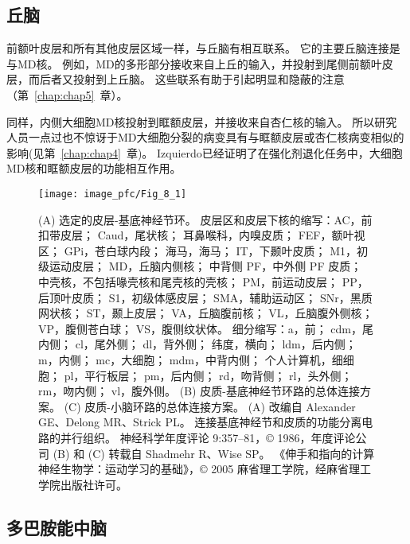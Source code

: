 \subsection{丘脑}
\par

前额叶皮层和所有其他皮层区域一样，与丘脑有相互联系。
它的主要丘脑连接是与MD核。
例如，MD的多形部分接收来自上丘的输入\cite{russchen1987afferent,erickson2004subcortical}，并投射到尾侧前额叶皮层，而后者又投射到上丘脑\cite{fries1984cortical}。
这些联系有助于引起明显和隐蔽的注意（第~\ref{chap:chap5}~章）。
\par


同样，内侧大细胞MD核投射到眶额皮层\cite{ray1993organization}，并接收来自杏仁核的输入\cite{russchen1987afferent}。
所以研究人员一点过也不惊讶于MD大细胞分裂的病变具有与眶额皮层或杏仁核病变相似的影响\cite{mitchell2007neurotoxic}(见第~\ref{chap:chap4}~章)。
Izquierdo\cite{izquierdo2010functional}已经证明了在强化剂退化任务中，大细胞MD核和眶额皮层的功能相互作用。


\begin{figure} 
	\centering
	\texttt{[image: image\_pfc/Fig\_8\_1]}
	\caption{(A) 选定的皮层-基底神经节环。 
	皮层区和皮层下核的缩写：AC，前扣带皮层； Caud，尾状核； 耳鼻喉科，内嗅皮质； FEF，额叶视区； GPi，苍白球内段； 海马，海马； IT，下颞叶皮质； M1，初级运动皮层； MD，丘脑内侧核； 中背侧 PF，中外侧 PF 皮质； 中壳核，不包括喙壳核和尾壳核的壳核； PM，前运动皮层； PP，后顶叶皮质； S1，初级体感皮层； SMA，辅助运动区； SNr，黑质网状核； ST，颞上皮层； VA，丘脑腹前核； VL，丘脑腹外侧核； VP，腹侧苍白球； VS，腹侧纹状体。 细分缩写：a，前； cdm，尾内侧； cl，尾外侧； dl，背外侧； 纬度，横向； ldm，后内侧； m，内侧； mc，大细胞； mdm，中背内侧； 个人计算机，细细胞； pl，平行板层； pm，后内侧； rd，吻背侧； rl，头外侧； rm，吻内侧； vl，腹外侧。 (B) 皮质-基底神经节环路的总体连接方案。 (C) 皮质-小脑环路的总体连接方案。 (A) 改编自 Alexander GE、Delong MR、Strick PL。 连接基底神经节和皮质的功能分离电路的并行组织。 神经科学年度评论 9:357–81，© 1986，年度评论公司 (B) 和 (C) 转载自 Shadmehr R、Wise SP。 《伸手和指向的计算神经生物学：运动学习的基础》，© 2005 麻省理工学院，经麻省理工学院出版社许可。\label{fig:8_1}}
\end{figure}





\subsection{多巴胺能中脑}
\par


